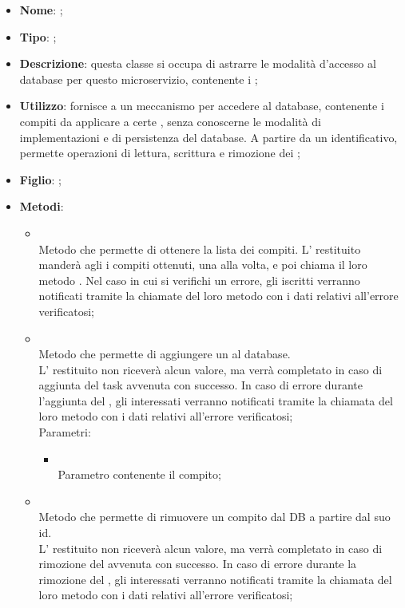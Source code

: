 \begin{itemize}
	\item \textbf{Nome}: ;
	\item \textbf{Tipo}: ;
	\item \textbf{Descrizione}: questa classe si occupa di astrarre le modalità d'accesso al database per questo microservizio, contenente i ;
	\item \textbf{Utilizzo}: fornisce a  un meccanismo per accedere al database, contenente i compiti da applicare a certe , senza conoscerne le modalità di implementazioni e di persistenza del database. A partire da un identificativo, permette operazioni di lettura, scrittura e rimozione dei ;
	\item \textbf{Figlio}: ;
	\item \textbf{Metodi}:
	\begin{itemize}
		\item[]  \\
		Metodo che permette di ottenere la lista dei compiti. L' restituito manderà agli  i compiti ottenuti, una alla volta, e poi chiama il loro metodo . Nel caso in cui si verifichi un errore, gli  iscritti verranno notificati tramite la chiamate del loro metodo  con i dati relativi all'errore verificatosi;\\
		\item[]  \\
		Metodo che permette di aggiungere un  al database. \\ L' restituito non riceverà alcun valore, ma verrà completato in caso di aggiunta del task avvenuta con successo. In caso di errore durante l'aggiunta del , gli  interessati verranno notificati tramite la chiamata del loro metodo  con i dati relativi all'errore verificatosi;\\
		Parametri:
		\begin{itemize}
			\item {} \\
			Parametro contenente il compito;
		\end{itemize}
		\item[]  \\
		Metodo che permette di rimuovere un compito dal DB a partire dal suo id. \\ L' restituito non riceverà alcun valore, ma verrà completato in caso di rimozione del  avvenuta con successo. In caso di errore durante la rimozione del , gli  interessati verranno notificati tramite la chiamata del loro metodo  con i dati relativi all'errore verificatosi;\\

\end{itemize}
\end{itemize}
